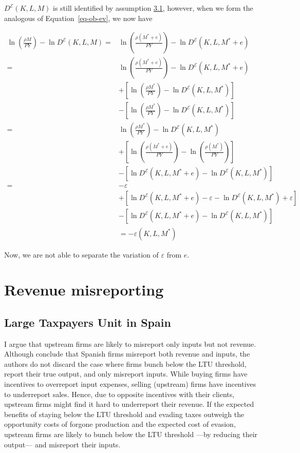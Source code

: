 \documentclass[
  12pt]{article}
\begin{document}
\(D^{\mathcal{E}}(K,L,M)\) is still identified by assumption
\hyperref[ass-non-ev]{3.1}, however, when we form the analogous of
Equation~\ref{eq-ob-ev}, we now have

\[
\begin{aligned}
\ln\left(\frac{\rho M}{PY}\right)-\ln D^{\mathcal{E}}(K,L,M)=&\ln\left(\frac{\rho(M^*+e)}{PY}\right)-\ln D^{\mathcal{E}}(K,L,M^*+e)\\
=&\ln\left(\frac{\rho(M^*+e)}{PY}\right)-\ln D^{\mathcal{E}}(K,L,M^*+e)\\
&+\left[\ln\left(\frac{\rho M^*}{PY}\right)-\ln D^{\mathcal{E}}(K,L,M^*)\right]\\
&-\left[\ln\left(\frac{\rho M^*}{PY}\right)-\ln D^{\mathcal{E}}(K,L,M^*)\right] \\
=&\ln\left(\frac{\rho M^*}{PY}\right)-\ln D^{\mathcal{E}}(K,L,M^*) \\
&+\left[\ln\left(\frac{\rho(M^*+e)}{PY}\right)-\ln\left(\frac{\rho(M^*)}{PY}\right)\right]\\
&-\left[\ln D^{\mathcal{E}}(K,L,M^*+e)-\ln D^{\mathcal{E}}(K,L,M^*)\right]\\
=& -\varepsilon \\
&+\left[\ln D^{\mathcal{E}}(K,L,M^*+e)-\varepsilon-\ln D^{\mathcal{E}}(K,L,M^*)+\varepsilon\right]\\
&-\left[\ln D^{\mathcal{E}}(K,L,M^*+e)-\ln D^{\mathcal{E}}(K,L,M^*)\right]\\
&= -\varepsilon(K,L,M^*)
\end{aligned}
\]

Now, we are not able to separate the variation of \(\varepsilon\) from
\(e\).

\section{Revenue misreporting}\label{revenue-misreporting}

\subsection{Large Taxpayers Unit in
Spain}\label{large-taxpayers-unit-in-spain}

I argue that upstream firms are likely to misreport only inputs but not
revenue. Although \citet{Almunia2018} conclude that Spanish firms
misreport both revenue and inputs, the authors do not discard the case
where firms bunch below the LTU threshold, report their true output, and
only misreport inputs. While buying firms have incentives to overreport
input expenses, selling (upstream) firms have incentives to underreport
sales. Hence, due to opposite incentives with their clients, upstream
firms might find it hard to underreport their revenue. If the expected
benefits of staying below the LTU threshold and evading taxes outweigh
the opportunity costs of forgone production and the expected cost of
evasion, upstream firms are likely to bunch below the LTU threshold
---by reducing their output--- and misreport their inputs.
\end{document}
